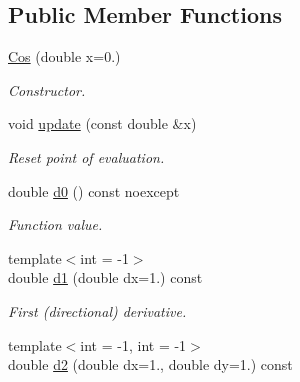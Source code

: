 \subsection*{Public Member Functions}
\begin{DoxyCompactItemize}
\item 
\hyperlink{structFunG_1_1CMath_1_1Cos_a0141b060cf225e312688d83cc4755405}{Cos} (double x=0.)
\begin{DoxyCompactList}\small\item\em Constructor. \end{DoxyCompactList}\item 
\hypertarget{structFunG_1_1CMath_1_1Cos_a8b05d39c50e40f56860992fff6f1b807}{void \hyperlink{structFunG_1_1CMath_1_1Cos_a8b05d39c50e40f56860992fff6f1b807}{update} (const double \&x)}\label{structFunG_1_1CMath_1_1Cos_a8b05d39c50e40f56860992fff6f1b807}

\begin{DoxyCompactList}\small\item\em Reset point of evaluation. \end{DoxyCompactList}\item 
\hypertarget{structFunG_1_1CMath_1_1Cos_aa46877147699c4cc83edf12748ac350b}{double \hyperlink{structFunG_1_1CMath_1_1Cos_aa46877147699c4cc83edf12748ac350b}{d0} () const noexcept}\label{structFunG_1_1CMath_1_1Cos_aa46877147699c4cc83edf12748ac350b}

\begin{DoxyCompactList}\small\item\em Function value. \end{DoxyCompactList}\item 
\hypertarget{structFunG_1_1CMath_1_1Cos_a2db41e7d2e1cf7491b4383de9fd3c57e}{{\footnotesize template$<$int  = -\/1$>$ }\\double \hyperlink{structFunG_1_1CMath_1_1Cos_a2db41e7d2e1cf7491b4383de9fd3c57e}{d1} (double dx=1.) const }\label{structFunG_1_1CMath_1_1Cos_a2db41e7d2e1cf7491b4383de9fd3c57e}

\begin{DoxyCompactList}\small\item\em First (directional) derivative. \end{DoxyCompactList}\item 
\hypertarget{structFunG_1_1CMath_1_1Cos_a1a93453bbcd2dfee78a77a43df905a17}{{\footnotesize template$<$int  = -\/1, int  = -\/1$>$ }\\double \hyperlink{structFunG_1_1CMath_1_1Cos_a1a93453bbcd2dfee78a77a43df905a17}{d2} (double dx=1., double dy=1.) const }\label{structFunG_1_1CMath_1_1Cos_a1a93453bbcd2dfee78a77a43df905a17}


\end{DoxyCompactItemize}
